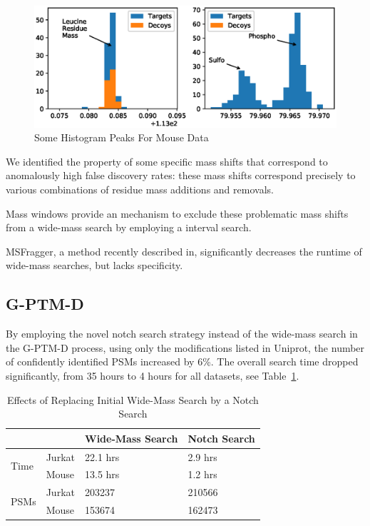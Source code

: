 \documentclass[journal=jprobs,manuscript=article]{achemso}
\begin{document}
\begin{figure}
\caption{Some Histogram Peaks For Mouse Data}
\label{fig:fig5-HistogramsAround80and113}
\includegraphics{fig5-HistogramsAround80and113}
\end{figure}

We identified the property of some specific mass shifts that correspond to anomalously high false discovery rates: these mass shifts correspond precisely to various combinations of residue mass additions and removals.

Mass windows provide an mechanism to exclude these problematic mass shifts from a wide-mass search by employing a interval search.

MSFragger, a method recently described in\cite{Kong_2017}, significantly decreases the runtime of wide-mass searches, but lacks specificity.

\subsection{G-PTM-D}

By employing the novel notch search strategy instead of the wide-mass search in the G-PTM-D process, using only the modifications listed in Uniprot, the number of confidently identified PSMs increased by 6\%.
The overall search time dropped significantly, from 35 hours to 4 hours for all datasets, see Table~\ref{my-label}.

\begin{table}[]
\centering
\caption{Effects of Replacing Initial Wide-Mass Search by a Notch Search}
\label{my-label}
\begin{tabular}{ll|l|l}
                      &        & Wide-Mass Search & Notch Search\\
\hline
\multirow{2}{*}{Time} & Jurkat & 22.1 hrs         & 2.9 hrs    \\
                      & Mouse  & 13.5 hrs         & 1.2 hrs   \\
\hline
\multirow{2}{*}{PSMs} & Jurkat & 203237           & 210566    \\
                      & Mouse  & 153674           & 162473   
\end{tabular}
\end{table}
\end{document}

